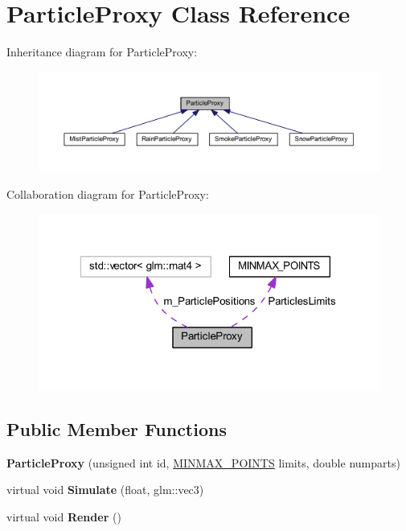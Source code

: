 \hypertarget{class_particle_proxy}{}\section{Particle\+Proxy Class Reference}
\label{class_particle_proxy}


Inheritance diagram for Particle\+Proxy\+:
\nopagebreak
\begin{figure}[H]
\begin{center}
\leavevmode
\includegraphics[width=350pt]{class_particle_proxy__inherit__graph}
\end{center}
\end{figure}


Collaboration diagram for Particle\+Proxy\+:
\nopagebreak
\begin{figure}[H]
\begin{center}
\leavevmode
\includegraphics[width=323pt]{class_particle_proxy__coll__graph}
\end{center}
\end{figure}
\subsection*{Public Member Functions}
\begin{DoxyCompactItemize}
\item 
{\bfseries Particle\+Proxy} (unsigned int id, \hyperlink{struct_m_i_n_m_a_x___p_o_i_n_t_s}{M\+I\+N\+M\+A\+X\+\_\+\+P\+O\+I\+N\+TS} limits, double numparts)\hypertarget{class_particle_proxy_a478ee7fa76d2745e7f16f049dbfd9c72}{}\label{class_particle_proxy_a478ee7fa76d2745e7f16f049dbfd9c72}

\item 
virtual void {\bfseries Simulate} (float, glm\+::vec3)\hypertarget{class_particle_proxy_ac4e12926d2dd038f2e27995fede2fd3e}{}\label{class_particle_proxy_ac4e12926d2dd038f2e27995fede2fd3e}

\item 
virtual void {\bfseries Render} ()\hypertarget{class_particle_proxy_a54c146ddfc2fae7d2b880bd1d788f3a6}{}\label{class_particle_proxy_a54c146ddfc2fae7d2b880bd1d788f3a6}

\end{DoxyCompactItemize}

